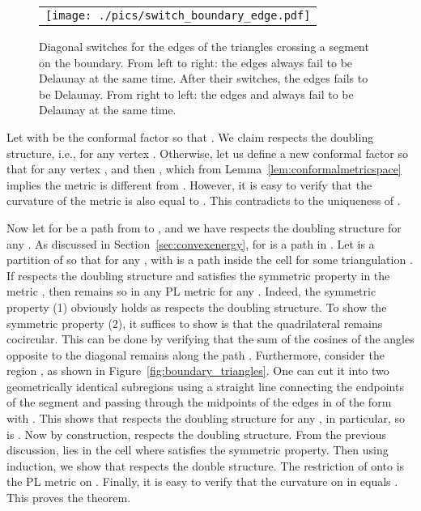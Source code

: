 \documentclass[11pt]{article}
\newenvironment{proof}[1][Proof]{\begin{trivlist}
\item[\hskip \labelsep {\bfseries #1}]}{\end{trivlist}}
\begin{document}
\begin{proof}
\begin{figure}[!t]
\begin{center}
\begin{tabular}{c}
\texttt{[image: ./pics/switch\_boundary\_edge.pdf]}\\
\end{tabular}
\end{center}
\vspace{-0.1in}
\caption{Diagonal switches for the edges of the triangles crossing a segment on the boundary.
From left to right: the edges  always fail to be Delaunay at the same time. 
After their switches, the edges  fails to be Delaunay. From right to left: the edges  and  always fail to be Delaunay at the same time.  
\label{fig:switch_boundary_edge}}
\end{figure}

Let  with  be the conformal factor 
so that . We claim  respects the doubling structure, i.e.,  
for any vertex . Otherwise, let us define a new conformal factor  so that  
for any vertex , and then , which from Lemma~\ref{lem:conformalmetricspace} 
implies the metric  is different from  . However, it is easy to verify that the 
curvature of the metric  is also equal to .
This contradicts to the uniqueness of . 

Now let  for  be a path from  to , and we have  respects the doubling 
structure for any . As discussed in Section~\ref{sec:convexenergy},  for 
is a path in . Let  is a partition of  so that for any , 
 with  is a path inside the cell  for some triangulation .
If  respects the doubling structure and  satisfies the symmetric property in the metric , 
then  remains so in any PL metric  for any . Indeed, the symmetric 
property (1) obviously holds as  respects the doubling structure. To show the symmetric property (2), it suffices 
to show is that the quadrilateral  remains cocircular.  This can be done by verifying that the sum of 
the cosines of the angles opposite to the diagonal remains  along the path . 
Furthermore, consider the region , 
as shown in Figure~\ref{fig:boundary_triangles}. One can cut it into two geometrically identical subregions using a 
straight line connecting the endpoints of the segment  and passing through the midpoints of the edges
in  of the form  with . This shows that  respects the doubling structure for 
any , in particular, so is . 
Now by construction,  respects the doubling structure.  From the previous discussion, 
lies in the cell  where  satisfies the symmetric property. 
Then using induction, we show that  respects the double structure. 
The restriction of  onto  is the PL metric  on . Finally, it is easy to verify 
that the curvature on  in  equals . This proves the theorem.  
\end{proof}
\end{document}
